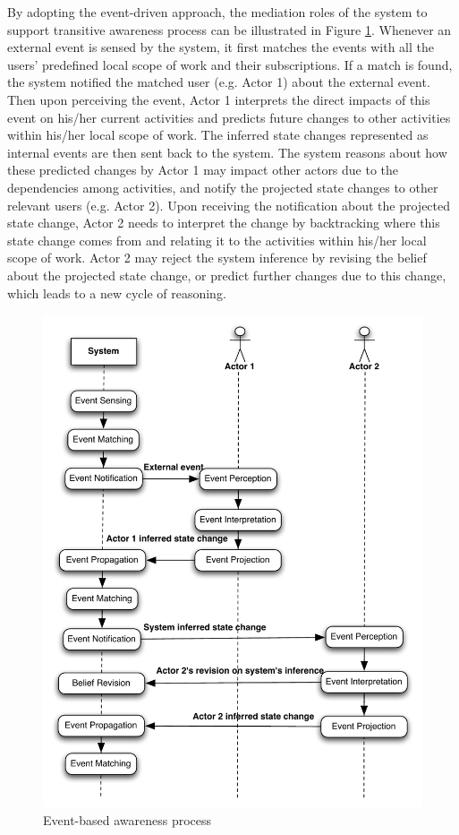 By adopting the event-driven approach, the mediation roles of the system to support transitive awareness process can be illustrated in Figure \ref{fig:comp_framework}. Whenever an external event is sensed by the system, it first matches the events with all the users’ predefined local scope of work and their subscriptions. If a match is found, the system notified the matched user (e.g. Actor 1) about the external event. Then upon perceiving the event, Actor 1 interprets the direct impacts of this event on his/her current activities and predicts future changes to other activities within his/her local scope of work. The inferred state changes represented as internal events are then sent back to the system. The system reasons about how these predicted changes by Actor 1 may impact other actors due to the dependencies among activities, and notify the projected state changes to other relevant users (e.g. Actor 2). Upon receiving the notification about the projected state change, Actor 2 needs to interpret the change by backtracking where this state change comes from and relating it to the activities within his/her local scope of work. Actor 2 may reject the system inference by revising the belief about the projected state change, or predict further changes due to this change, which leads to a new cycle of reasoning.

\begin{figure}[htbp] %
   \centering
   \includegraphics[width=5.5in]{comp_framework.pdf} 
   \caption{Event-based awareness process}
   \label{fig:comp_framework}
\end{figure}






 

